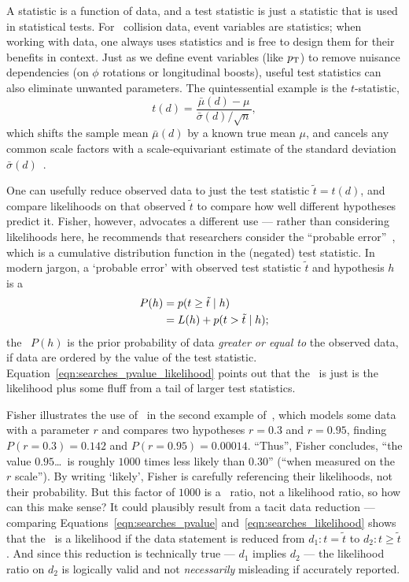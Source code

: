 A statistic is a function of data, and a test statistic is just a statistic
that is used in statistical tests.
For \atlas\ collision data, event variables are statistics; when working with
data, one always uses statistics and is free to design them for their benefits
in context.
Just as we define event variables (like $p_\mathrm{T}$) to remove nuisance
dependencies (on $\phi$ rotations or longitudinal boosts),
useful test statistics can also eliminate unwanted parameters.
The quintessential example is the $t$-statistic,
\begin{equation}
\label{eqn:searches_t_statistic}
t(d) = \frac{\bar{\mu}(d) - \mu}{\bar{\sigma}(d)/\sqrt{n}}
,
\end{equation}
which shifts the sample mean $\bar{\mu}(d)$ by a known true mean $\mu$, and
cancels any common scale factors with a scale-equivariant estimate of the
standard deviation $\bar{\sigma}(d)$~\cite{
student1908,
fisher1925t,
lehmann2011fisher
}.

One can usefully reduce observed data to just the test statistic
$\tilde{t} = t(d)$, and compare likelihoods on that observed $\tilde{t}$
to compare how well different hypotheses predict it.
Fisher, however, advocates a different use ---
rather than considering likelihoods here, he recommends
that researchers consider the ``probable error''~\cite{fisher1921probable},
which is a cumulative distribution function in the (negated) test statistic.
In modern jargon, a `probable error' with observed test statistic
$\tilde{t}$ and hypothesis $h$ is a \textbf{\pvalue}
\begin{align}
P(h)
&= p(t \geq \tilde{t} \mid h)
\label{eqn:searches_pvalue}
\\
&= L(h) + p(t > \tilde{t} \mid h)
\label{eqn:searches_pvalue_likelihood}
;
\end{align}
the \pvalue\ $P(h)$ is the prior probability of data
\emph{greater or equal to} the observed data, if data are ordered by the value
of the test statistic.
Equation~\ref{eqn:searches_pvalue_likelihood} points out that the \pvalue\ is
just is the likelihood plus some fluff from a tail of larger test statistics.

Fisher illustrates the use of \pvalues\ in the second example
of~\cite{fisher1921probable}, which models some data with a parameter $r$ and
compares two hypotheses
$r=0.3$ and
$r=0.95$, finding \pvalues\
$P(r=0.3)=0.142$ and
$P(r=0.95)=0.00014$.
``Thus'', Fisher concludes, ``the value $0.95$\ldots\ is roughly $1000$ times
less likely than $0.30$''
(``when measured on the $r$ scale'').
By writing `likely', Fisher is carefully referencing their likelihoods,
not their probability.
But this factor of $1000$ is a \pvalue\ ratio, not a likelihood ratio,
so how can this make sense?
It could plausibly result from a tacit data reduction --- comparing
Equations~\ref{eqn:searches_pvalue} and~\ref{eqn:searches_likelihood}
shows that the \pvalue\ is a likelihood if the data statement is reduced from
$d_1: t =    \tilde{t}$ to
$d_2: t \geq \tilde{t}$.
And since this reduction is technically true --- $d_1$ implies $d_2$ --- the
likelihood ratio on $d_2$ is logically valid and not \emph{necessarily}
misleading if accurately reported.

